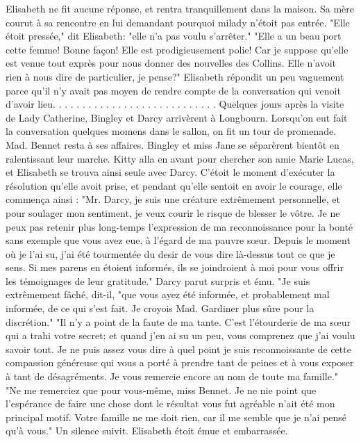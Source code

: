 Elisabeth ne fit aucune réponse, et rentra tranquillement dans la maison. Sa mère courut à sa rencontre en lui demandant pourquoi milady n'étoit pas entrée.
"Elle étoit pressée," dit Elisabeth: "elle n'a pas voulu s'arrêter."
"Elle a un beau port cette femme! Bonne façon! Elle est prodigieusement polie! Car je suppose qu'elle est venue tout exprès pour nous donner des nouvelles des Collins. Elle n'avoit rien à nous dire de particulier, je pense?"
Elisabeth répondit un peu vaguement\setcounter{page}{261} parce qu’il n’y avait pas moyen de rendre compte de la conversation qui venoit d’avoir lieu. . . . . . . . . . . . . . . . . . . . . . . . . . . .
Quelques jours après la visite de Lady Catherine, Bingley et Darcy arrivèrent à Longbourn. Lorsqu’on eut fait la conversation quelques momens dans le sallon, on fit un tour de promenade. Mad. Bennet resta à ses affaires. Bingley et miss Jane se séparèrent bientôt en ralentissant leur marche. Kitty alla en avant pour chercher son amie Marie Lucas, et Elisabeth se trouva ainsi seule avec Darcy. C’étoit le moment d’exécuter la résolution qu’elle avoit prise, et pendant qu’elle sentoit en avoir le courage, elle commença ainsi :
"Mr. Darcy, je suis une créature extrêmement personnelle, et pour soulager mon sentiment, je veux courir le risque de blesser le vôtre. Je ne peux pas retenir plus long-temps l’expression de ma reconnoissance pour la bonté sans exemple que vous avez eue, à l’égard de ma pauvre sœur. Depuis le moment où je l’ai su, j’ai été tourmentée du desir de vous dire là-dessus tout ce que je sens. Si mes parens en étoient informés, ils se joindroient à moi pour vous offrir les témoignages de leur gratitude."
Darcy parut surpris et ému. "Je suis extrêmement\setcounter{page}{262} fâché, dit-il, "que vous ayez été informée, et probablement mal informée, de ce qui s'est fait. Je croyois Mad. Gardiner plus sûre pour la discrétion."
"Il n'y a point de la faute de ma tante. C'est l'étourderie de ma sœur qui a trahi votre secret; et quand j'en ai su un peu, vous comprenez que j'ai voulu savoir tout. Je ne puis assez vous dire à quel point je suis reconnoissante de cette compassion généreuse qui vous a porté à prendre tant de peines et à vous exposer à tant de désagréments. Je vous remercie encore au nom de toute ma famille."
"Ne me remerciez que pour vous-même, miss Bennet. Je ne nie point que l'espérance de faire une chose dont le résultat vous fut agréable n'ait été mon principal motif. Votre famille ne me doit rien, car il me semble que je n'ai pensé qu'à vous."
Un silence suivit. Elisabeth étoit émue et embarrassée.
